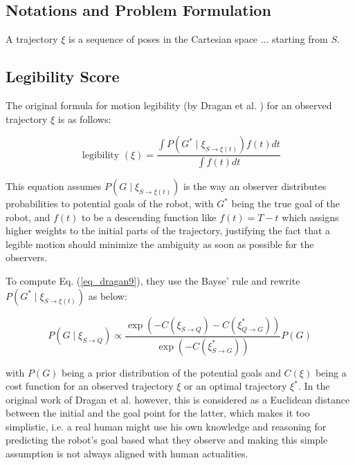 \subsection{Notations and Problem Formulation}

A trajectory $\xi$ is a sequence of poses in the Cartesian space  ... starting from $S$.



\subsection{Legibility Score}

The original formula for motion legibility (by Dragan et al. \cite{dragan2013legibility}) for an observed trajectory $\xi$ \cite{dragan2013legibility} is as follows:

\begin{equation}
    \label{eq_dragan9}
    \text { legibility }(\xi)=\frac{\int P\left(G^* \mid \xi_{S \rightarrow \xi(t)}\right) f(t) d t}{\int f(t) d t}
\end{equation}

\noindent
This equation assumes $P\left(G \mid \xi_{S \rightarrow \xi(t)}\right)$ is the way an observer distributes probabilities to potential goals of the robot, with $G^*$ being the true goal of the robot, and $f(t)$ to be a descending function like $f(t)=T-t$ which assigns higher weights to the initial parts of the trajectory, justifying the fact that a legible motion should minimize the ambiguity as soon as possible for the observers.

To compute Eq. (\ref{eq_dragan9}), they use the Bayse' rule and rewrite $P\left(G^* \mid \xi_{S \rightarrow \xi(t)}\right)$ as below:

\begin{equation}
    \label{eq_dragan8} 
    P\left(G \mid \xi_{S \rightarrow Q}\right) \propto \frac{\exp \left(-C\left(\xi_{S \rightarrow Q}\right)-C\left(\xi_{Q \rightarrow G}^*\right)\right)}{\exp \left(-C\left(\xi_{S \rightarrow G}^*\right)\right)} P(G)
\end{equation}

with $P(G)$ being a prior distribution of the potential goals and $C(\xi)$ being a cost function for an observed trajectory $\xi$ or an optimal trajectory $\xi^*$. In the original work of Dragan et al. \cite{dragan2013legibility} however, this is considered as a Euclidean distance between the initial and the goal point for the latter, which makes it too simplistic, i.e. a real human might use his own knowledge and reasoning for predicting the robot's goal based what they observe and making this simple assumption is not always aligned with human actualities.



